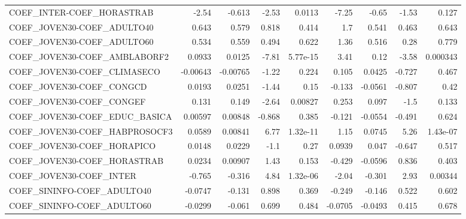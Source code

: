\begin{tabular}{lrrrrrrrr}
COEF\_INTER-COEF\_HORASTRAB              &       -2.54 &       -0.613 &    -2.53 &   0.0113 &      -7.25 &       -0.65 &        -1.53 &         0.127 \\
COEF\_JOVEN30-COEF\_ADULTO40             &       0.643 &        0.579 &    0.818 &    0.414 &        1.7 &       0.541 &        0.463 &         0.643 \\
COEF\_JOVEN30-COEF\_ADULTO60             &       0.534 &        0.559 &    0.494 &    0.622 &       1.36 &       0.516 &         0.28 &         0.779 \\
COEF\_JOVEN30-COEF\_AMBLABORF2           &      0.0933 &       0.0125 &    -7.81 & 5.77e-15 &       3.41 &        0.12 &        -3.58 &      0.000343 \\
COEF\_JOVEN30-COEF\_CLIMASECO            &    -0.00643 &     -0.00765 &    -1.22 &    0.224 &      0.105 &      0.0425 &       -0.727 &         0.467 \\
COEF\_JOVEN30-COEF\_CONGCD               &      0.0193 &       0.0251 &    -1.44 &     0.15 &     -0.133 &     -0.0561 &       -0.807 &          0.42 \\
COEF\_JOVEN30-COEF\_CONGEF               &       0.131 &        0.149 &    -2.64 &  0.00827 &      0.253 &       0.097 &         -1.5 &         0.133 \\
COEF\_JOVEN30-COEF\_EDUC\_BASICA          &     0.00597 &      0.00848 &   -0.868 &    0.385 &     -0.121 &     -0.0554 &       -0.491 &         0.624 \\
COEF\_JOVEN30-COEF\_HABPROSOCF3          &      0.0589 &      0.00841 &     6.77 & 1.32e-11 &       1.15 &      0.0745 &         5.26 &      1.43e-07 \\
COEF\_JOVEN30-COEF\_HORAPICO             &      0.0148 &       0.0229 &     -1.1 &     0.27 &     0.0939 &       0.047 &       -0.647 &         0.517 \\
COEF\_JOVEN30-COEF\_HORASTRAB            &      0.0234 &      0.00907 &     1.43 &    0.153 &     -0.429 &     -0.0596 &        0.836 &         0.403 \\
COEF\_JOVEN30-COEF\_INTER                &      -0.765 &       -0.316 &     4.84 & 1.32e-06 &      -2.04 &      -0.301 &         2.93 &       0.00344 \\
COEF\_SININFO-COEF\_ADULTO40             &     -0.0747 &       -0.131 &    0.898 &    0.369 &     -0.249 &      -0.146 &        0.522 &         0.602 \\
COEF\_SININFO-COEF\_ADULTO60             &     -0.0299 &       -0.061 &    0.699 &    0.484 &    -0.0705 &     -0.0493 &        0.415 &         0.678 \\

\end{tabular}
